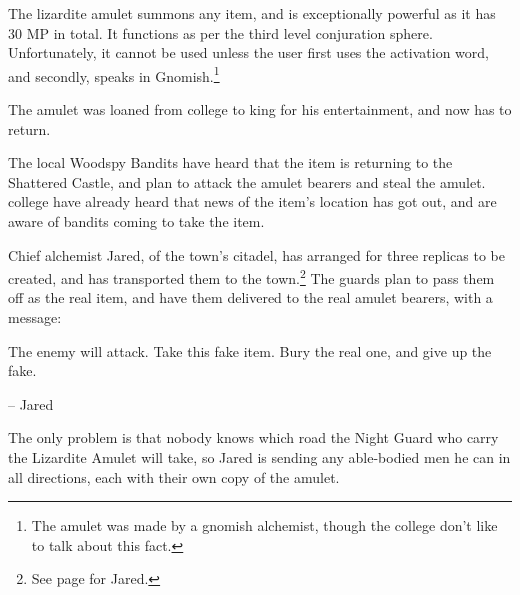 \begin{multicols}{2}

\resumecontents[Town]

\resumecontents[Villages]
\label{lizardite}
\stopcontents[Villages]

\startcontents[sq]

\sqminitoc

\noindent
The lizardite amulet summons any item, and is exceptionally powerful as it has 30 MP in total.  It functions as per the third level conjuration sphere.  Unfortunately, it cannot be used unless the user first uses the activation word, and secondly, speaks in Gnomish.\footnote{The amulet was made by a gnomish alchemist, though the college don't like to talk about this fact.}


The amulet was loaned from \gls{college} to \gls{king} for his entertainment, and now has to return.


The local Woodspy Bandits have heard that the item is returning to the Shattered Castle, and plan to attack the amulet bearers and steal the amulet.
\Gls{college} have already heard that news of the item's location has got out, and are aware of bandits coming to take the item.

Chief alchemist Jared, of the town's citadel, has arranged for three replicas to be created, and has transported them to the town.\footnote{See page \pageref{citadel_alchemist} for Jared.}
The guards plan to pass them off as the real item, and have them delivered to the real amulet bearers, with a message:

\begin{boxtext}

	The enemy will attack.
	Take this fake item.
	Bury the real one, and give up the fake.

	-- Jared

\end{boxtext}

The only problem is that nobody knows which road the Night Guard who carry the Lizardite Amulet will take, so Jared is sending any able-bodied men he can in all directions, each with their own copy of the amulet.


\end{multicols}
